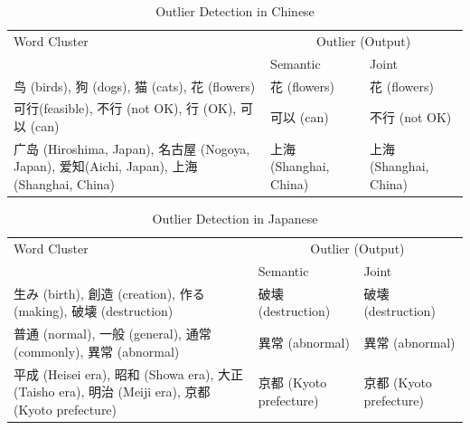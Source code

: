 \begin{table}[h]
    \centering
    \begin{CJK}{UTF8}{gbsn}
        \begin{tabularx}{\textwidth}{bll}
            \toprule
            \multirow{2.5}{*}{Word Cluster} & \multicolumn{2}{c}{Outlier (Output)} \\
            \cmidrule(lr){2-3} {} & Semantic & Joint \\\midrule

            鸟 (birds), 狗 (dogs), 猫 (cats), 花 (flowers) & \vspace{0.25cm} 花 (flowers) & 花 (flowers) \\

            可行(feasible), 不行 (not OK), 行 (OK), 可以 (can) & \vspace{0.25cm} 可以 (can) & 不行 (not OK) \\

            广岛 (Hiroshima, Japan), 名古屋 (Nogoya, Japan), 爱知(Aichi, Japan), 上海 (Shanghai, China) & 上海 (Shanghai, China) & 上海 (Shanghai, China)\\\bottomrule
        \end{tabularx}
    \end{CJK}
    \caption{Outlier Detection in Chinese}
    \label{tab:analysis_outlier1}
\end{table}

\begin{table}[h]
    \centering
    \begin{CJK}{UTF8}{long}
        \begin{tabularx}{\textwidth}{bll}
            \toprule
            \multirow{2.5}{*}{Word Cluster} & \multicolumn{2}{c}{Outlier (Output)} \\
            \cmidrule(lr){2-3} {} & Semantic & Joint \\\midrule
            生み (birth), 創造 (creation), 作る (making), 破壊 (destruction) & \vspace{0.25cm} 破壊 (destruction) & 破壊 (destruction) \\
            普通 (normal), 一般 (general), 通常 (commonly), 異常 (abnormal) & \vspace{0.25cm} 異常 (abnormal) & 異常 (abnormal) \\
            平成 (Heisei era), 昭和 (Showa era), 大正 (Taisho era), 明治 (Meiji era), 京都 (Kyoto prefecture) & 京都 (Kyoto prefecture) & 京都 (Kyoto prefecture) \\\bottomrule
        \end{tabularx}
    \end{CJK}
    \caption{Outlier Detection in Japanese}
    \label{tab:analysis_outlier2}
\end{table}

